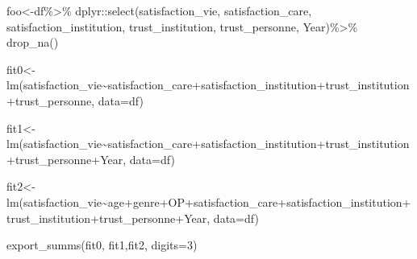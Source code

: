 \documentclass[
]{book}
\newenvironment{Shaded}{\begin{snugshade}}{\end{snugshade}}
\newcommand{\AttributeTok}[1]{\textcolor[rgb]{0.77,0.63,0.00}{#1}}
\newcommand{\DecValTok}[1]{\textcolor[rgb]{0.00,0.00,0.81}{#1}}
\newcommand{\FunctionTok}[1]{\textcolor[rgb]{0.00,0.00,0.00}{#1}}
\newcommand{\NormalTok}[1]{#1}
\newcommand{\OtherTok}[1]{\textcolor[rgb]{0.56,0.35,0.01}{#1}}
\newcommand{\SpecialCharTok}[1]{\textcolor[rgb]{0.00,0.00,0.00}{#1}}
\begin{document}
\begin{Shaded}
\begin{Highlighting}[]
\NormalTok{foo}\OtherTok{\textless{}{-}}\NormalTok{df}\SpecialCharTok{\%\textgreater{}\%} 
\NormalTok{  dplyr}\SpecialCharTok{::}\FunctionTok{select}\NormalTok{(satisfaction\_vie, satisfaction\_care, satisfaction\_institution, trust\_institution, trust\_personne, Year)}\SpecialCharTok{\%\textgreater{}\%}
  \FunctionTok{drop\_na}\NormalTok{()}

\NormalTok{fit0}\OtherTok{\textless{}{-}}\FunctionTok{lm}\NormalTok{(satisfaction\_vie}\SpecialCharTok{\textasciitilde{}}\NormalTok{satisfaction\_care}\SpecialCharTok{+}\NormalTok{satisfaction\_institution}\SpecialCharTok{+}\NormalTok{trust\_institution}\SpecialCharTok{+}\NormalTok{trust\_personne,  }\AttributeTok{data=}\NormalTok{df)}

\NormalTok{fit1}\OtherTok{\textless{}{-}}\FunctionTok{lm}\NormalTok{(satisfaction\_vie}\SpecialCharTok{\textasciitilde{}}\NormalTok{satisfaction\_care}\SpecialCharTok{+}\NormalTok{satisfaction\_institution}\SpecialCharTok{+}\NormalTok{trust\_institution}\SpecialCharTok{+}\NormalTok{trust\_personne}\SpecialCharTok{+}\NormalTok{Year,  }\AttributeTok{data=}\NormalTok{df)}

\NormalTok{fit2}\OtherTok{\textless{}{-}}\FunctionTok{lm}\NormalTok{(satisfaction\_vie}\SpecialCharTok{\textasciitilde{}}\NormalTok{age}\SpecialCharTok{+}\NormalTok{genre}\SpecialCharTok{+}\NormalTok{OP}\SpecialCharTok{+}\NormalTok{satisfaction\_care}\SpecialCharTok{+}\NormalTok{satisfaction\_institution}\SpecialCharTok{+}\NormalTok{trust\_institution}\SpecialCharTok{+}\NormalTok{trust\_personne}\SpecialCharTok{+}\NormalTok{Year,  }\AttributeTok{data=}\NormalTok{df)}



\FunctionTok{export\_summs}\NormalTok{(fit0, fit1,fit2, }\AttributeTok{digits=}\DecValTok{3}\NormalTok{)}
\end{Highlighting}
\end{Shaded}

 
  \providecommand{\huxb}[2]{\arrayrulecolor[RGB]{#1}\global\arrayrulewidth=#2pt}
  \providecommand{\huxvb}[2]{\color[RGB]{#1}\vrule width #2pt}
  \providecommand{\huxtpad}[1]{\rule{0pt}{#1}}
  \providecommand{\huxbpad}[1]{\rule[-#1]{0pt}{#1}}
\end{document}
